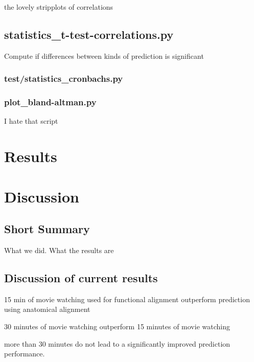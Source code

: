 {the lovely stripplots of correlations

\subsection{statistics\_t-test-correlations.py}

Compute if differences between kinds of prediction is significant


\subsubsection{test/statistics\_cronbachs.py}

\subsubsection{plot\_bland-altman.py}

I hate that script



\section{Results}




\section{Discussion}


\subsection{Short Summary}

What we did. What the results are

\subsection{Discussion of current results}

%
15 min of movie watching used for functional alignment outperform prediction
using anatomical alignment

%
30 minutes of movie watching outperform 15 minutes of movie watching

%
more than 30 minutes do not lead to a significantly improved prediction
performance.
%

}
